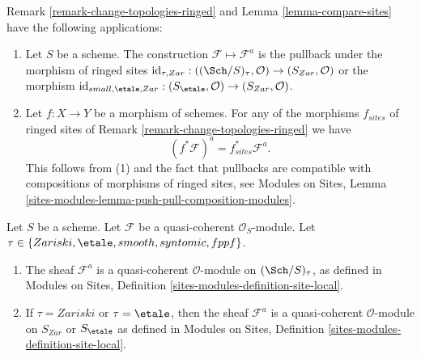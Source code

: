 \begin{remark}
\label{remark-change-topologies-ringed-sites}
Remark \ref{remark-change-topologies-ringed}
and
Lemma \ref{lemma-compare-sites}
have the following applications:
\begin{enumerate}
\item Let $S$ be a scheme.
The construction $\mathcal{F} \mapsto \mathcal{F}^a$ is
the pullback under the morphism of ringed sites
$\text{id}_{\tau, Zar} : ((\Sch/S)_\tau, \mathcal{O})
\to (S_{Zar}, \mathcal{O})$
or the morphism
$\text{id}_{small, \etale, Zar} :
(S_\etale, \mathcal{O}) \to (S_{Zar}, \mathcal{O})$.
\item Let $f : X \to Y$ be a morphism of schemes.
For any of the morphisms $f_{sites}$ of ringed sites of
Remark \ref{remark-change-topologies-ringed}
we have
$$
(f^*\mathcal{F})^a = f_{sites}^*\mathcal{F}^a.
$$
This follows from (1) and the fact that pullbacks are compatible with
compositions of morphisms of ringed sites, see
Modules on Sites,
Lemma \ref{sites-modules-lemma-push-pull-composition-modules}.
\end{enumerate}
\end{remark}

\begin{lemma}
\label{lemma-quasi-coherent-gives-quasi-coherent}
Let $S$ be a scheme.
Let $\mathcal{F}$ be a quasi-coherent $\mathcal{O}_S$-module.
Let $\tau \in \{Zariski, \linebreak[0] \etale, \linebreak[0]
smooth, \linebreak[0] syntomic, \linebreak[0] fppf\}$.
\begin{enumerate}
\item The sheaf $\mathcal{F}^a$ is a quasi-coherent
$\mathcal{O}$-module on $(\Sch/S)_\tau$, as defined in
Modules on Sites, Definition \ref{sites-modules-definition-site-local}.
\item If $\tau = Zariski$ or $\tau = \etale$, then the sheaf
$\mathcal{F}^a$ is a quasi-coherent $\mathcal{O}$-module on
$S_{Zar}$ or $S_\etale$ as defined in
Modules on Sites, Definition \ref{sites-modules-definition-site-local}.
\end{enumerate}
\end{lemma}

